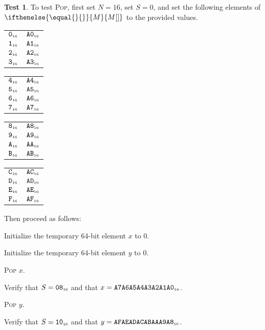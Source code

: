\documentclass[a4paper,12pt]{article}
\makeatletter
\newcommand{\num}[1]{\texttt{#1}}
\newcommand{\hex}[1]{\num{#1}_{\textup{\tiny 16}}}
\newcommand{\MEM}[1]{\ifthenelse{\equal{#1}{}}{M}{M[#1]}}
\newcommand{\SP}{S}
\newcommand{\proc}[1]{\textsc{#1}}
\theoremstyle{definition}
\newtheorem{test}{Test}
\newenvironment{memtable}{%
  \begin{trivlist}
    \item
    }{%
    \end{trivlist}}
\newenvironment{memcolumn}{%
  \begin{tabular}{@{}ll@{}}
    \hline}
    {%
    \hline
  \end{tabular}}
\newcommand{\memspace}{\qquad}
\makeatother
\begin{document}
\begin{test}
  To test \proc{Pop}, first set $N=16$, set $S=0$, and set the following elements of $\MEM{}$ to the provided values.
  \begin{memtable}
    \begin{memcolumn}
      $\hex{0}$ & $\hex{A0}$ \\
      $\hex{1}$ & $\hex{A1}$ \\
      $\hex{2}$ & $\hex{A2}$ \\
      $\hex{3}$ & $\hex{A3}$ \\
    \end{memcolumn}
    \memspace
    \begin{memcolumn}
      $\hex{4}$ & $\hex{A4}$ \\
      $\hex{5}$ & $\hex{A5}$ \\
      $\hex{6}$ & $\hex{A6}$ \\
      $\hex{7}$ & $\hex{A7}$ \\
    \end{memcolumn}
    \memspace
    \begin{memcolumn}
      $\hex{8}$ & $\hex{A8}$ \\
      $\hex{9}$ & $\hex{A9}$ \\
      $\hex{A}$ & $\hex{AA}$ \\
      $\hex{B}$ & $\hex{AB}$ \\
    \end{memcolumn}
    \memspace
    \begin{memcolumn}
      $\hex{C}$ & $\hex{AC}$ \\
      $\hex{D}$ & $\hex{AD}$ \\
      $\hex{E}$ & $\hex{AE}$ \\
      $\hex{F}$ & $\hex{AF}$ \\
    \end{memcolumn}
  \end{memtable}
  Then proceed as follows:
  \begin{stepnumbers}
  \item Initialize the temporary 64-bit element $x$ to $0$.
  \item Initialize the temporary 64-bit element $y$ to $0$.
  \item \proc{Pop} $x$.
  \item Verify that $\SP = \hex{08}$ and that $x = \hex{A7A6A5A4A3A2A1A0}$.
  \item \proc{Pop} $y$.
  \item Verify that $\SP = \hex{10}$ and that $y = \hex{AFAEADACABAAA9A8}$.
  \end{stepnumbers}
\end{test}
\end{document}
